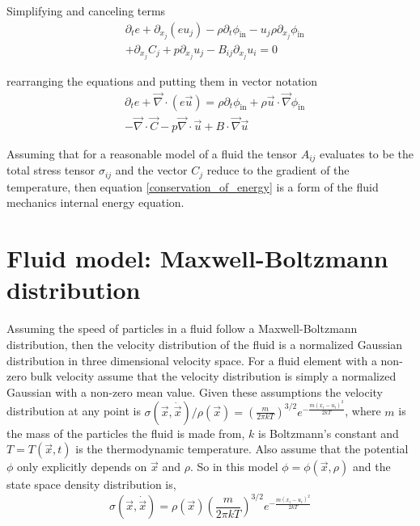 \documentclass[%
 reprint,
 amsmath,amssymb,
 aps,
]{revtex4-1}
\newcommand{\dvec}[1]{\dot{\vec{#1}}}
\newcommand{\grad}{\vec{\nabla}}
\begin{document}
Simplifying and canceling terms
\[
\begin{split}
& \partial_te + \partial_{x_j}\left(e u_j\right) - \rho\partial_t\phi_{\text{in}} - u_j\rho\partial_{x_j}\phi_{\text{in}} \\ & + \partial_{x_j}C_j + p\partial_{x_j}u_j - B_{ij}\partial_{x_j}u_i=0
\end{split}
\]

rearranging the equations and putting them in vector notation
\begin{equation}
\begin{split}
& \partial_te + \grad\cdot\left(e \vec{u}\right) = \rho\partial_t\phi_{\text{in}} + \rho\vec{u}\cdot\grad\phi_{\text{in}} \\ & - \grad\cdot\vec{C} - p\grad\cdot\vec{u} + B\cdot\grad\vec{u}
\end{split}
\label{conservation_of_energy}
\end{equation}

Assuming that for a reasonable model of a fluid the tensor $A_{ij}$ evaluates to be the total stress tensor $\sigma_{ij}$ and the vector $C_j$ reduce to the gradient of the temperature, then equation \eqref{conservation_of_energy} is a form of the fluid mechanics internal energy equation.

\section{Fluid model: Maxwell-Boltzmann distribution}
Assuming the speed of particles in a fluid follow a Maxwell-Boltzmann distribution, then the velocity distribution of the fluid is a normalized Gaussian distribution in three dimensional velocity space. For a fluid element with a non-zero bulk velocity assume that the velocity distribution is simply a normalized Gaussian with a non-zero mean value. Given these assumptions the velocity distribution at any point is $\sigma(\vec{x}, \dvec{x}) / \rho(\vec{x}) = \left(\frac{m}{2\pi kT}\right)^{3/2}e^{-\frac{m\left(x_i - u_i\right)^2}{2kT}}$, where $m$ is the mass of the particles the fluid is made from, $k$ is  Boltzmann's constant and $T=T(\vec{x}, t)$ is the thermodynamic temperature. Also assume that the potential $\phi$ only explicitly depends on $\vec{x}$ and $\rho$. So in this model $\phi=\phi(\vec{x}, \rho)$ and the state space density distribution is,
\begin{equation}
\sigma(\vec{x}, \dvec{x}) = \rho(\vec{x})\left(\frac{m}{2\pi kT}\right)^{3/2}e^{-\frac{m\left(x_i - u_i\right)^2}{2kT}}
\label{distribution_maxwell_boltzmann}
\end{equation}
\end{document}
